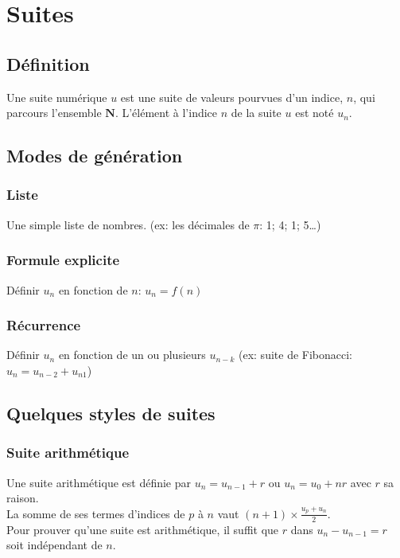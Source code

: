 \documentclass{article}
\begin{document}
\section{Suites}


\subsection{Définition}
    Une suite numérique $u$ est une suite de valeurs pourvues d'un indice, $n$, qui parcours l'ensemble $\mathbf{N}$. L'élément à l'indice $n$ de la suite $u$ est noté $u_n$.


\subsection{Modes de génération}

\subsubsection{Liste}
    Une simple liste de nombres. (ex: les décimales de $\pi$: 1; 4; 1; 5\dots)

\subsubsection{Formule explicite}
    Définir $u_n$ en fonction de $n$: $u_n = f(n)$

\subsubsection{Récurrence}
    Définir $u_n$ en fonction de un ou plusieurs $u_{n-k}$ (ex: suite de Fibonacci: $u_n = u_{n-2} + u_{n1}$)


\subsection{Quelques styles de suites}

\subsubsection{Suite arithmétique}
    Une suite arithmétique est définie par $u_n = u_{n-1} + r$ ou $u_n = u_0 + nr$ avec $r$ sa raison.\\
    La somme de ses termes d'indices de $p$ à $n$ vaut $(n+1)\times \frac{u_p+u_n}{2}$.\\
    Pour prouver qu'une suite est arithmétique, il suffit que $r$ dans $u_n - u_{n-1} = r$ soit indépendant de $n$.
\end{document}
